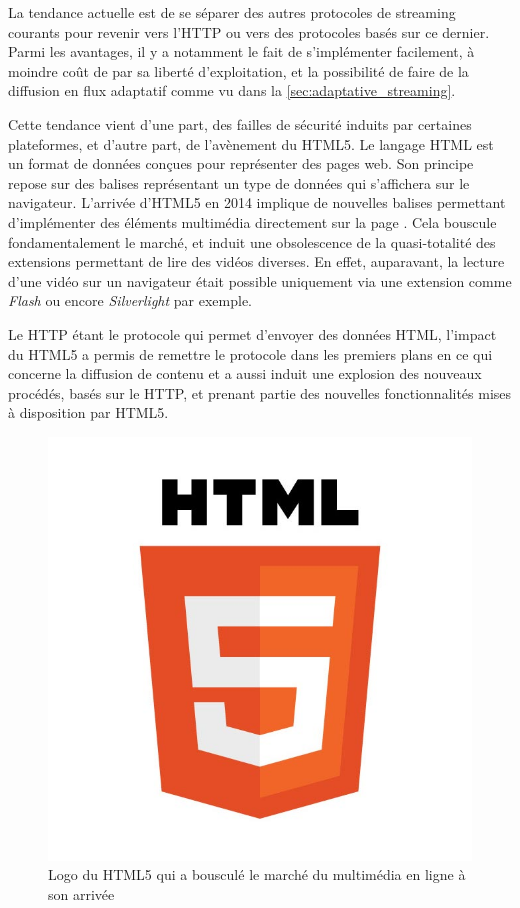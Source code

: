 \documentclass{polytech/polytech}
\begin{document}
La tendance actuelle est de se séparer des autres protocoles de streaming courants pour revenir vers l’HTTP ou vers des protocoles basés sur ce dernier. Parmi les avantages, il y a notamment le fait de s’implémenter facilement, à moindre coût de par sa liberté d’exploitation, et la possibilité de faire de la diffusion en flux adaptatif comme vu dans la \autoref{sec:adaptative_streaming}.


Cette tendance vient d’une part, des failles de sécurité induits par certaines plateformes, et d’autre part, de l’avènement du HTML5. Le langage HTML est un format de données conçues pour représenter des pages web. Son principe repose sur des balises représentant un type de données qui s’affichera sur le navigateur. L’arrivée d’HTML5 en 2014 implique de nouvelles balises permettant d’implémenter des éléments multimédia directement sur la page \cite{_html5_2017}. Cela bouscule fondamentalement le marché, et induit une obsolescence de la quasi-totalité des extensions permettant de lire des vidéos diverses. En effet, auparavant, la lecture d’une vidéo sur un navigateur était possible uniquement via une extension comme \textit{Flash} ou encore \textit{Silverlight} par exemple.

Le HTTP étant le protocole qui permet d’envoyer des données HTML, l’impact du HTML5 a permis de remettre le protocole dans les premiers plans en ce qui concerne la diffusion de contenu et a aussi induit une explosion des nouveaux procédés, basés sur le HTTP, et prenant partie des nouvelles fonctionnalités mises à disposition par HTML5.

\begin{figure}
	\includegraphics[scale=0.25]{images/html5logo}
	\caption{Logo du HTML5 qui a bousculé le marché du multimédia en ligne à son arrivée}
	\label{fig:html5logo}
\end{figure}
\end{document}
